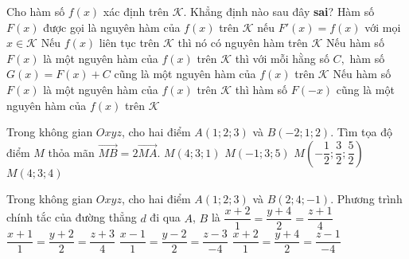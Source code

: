 \begin{ex}%
Cho hàm số $f(x)$ xác định trên $\mathscr{K}$. Khẳng định nào sau đây \textbf{sai}?
\choice
{Hàm số $F(x)$ được gọi là nguyên hàm của $f(x)$ trên $\mathscr{K}$ nếu $F'(x) = f(x)$ với mọi $x \in \mathscr{K}$}
{ Nếu $f(x)$ liên tục trên $\mathscr{K}$ thì nó có nguyên hàm trên $\mathscr{K}$}
{Nếu hàm số $F(x)$ là một nguyên hàm của $f(x)$ trên $\mathscr{K}$ thì với mỗi hằng số $C,$ hàm số $G(x) = F(x) + C$ cũng là một nguyên hàm của $f(x)$ trên $\mathscr{K}$}  
{\True Nếu hàm số $F(x)$ là một nguyên hàm của $f(x)$ trên $\mathscr{K}$ thì hàm số $F(-x)$ cũng là một nguyên hàm của $f(x)$ trên $\mathscr{K}$}  
\end{ex}

\begin{ex}%
Trong không gian $Oxyz$, cho hai điểm $A(1;2;3)$ và $B(-2;1;2)$. Tìm tọa độ điểm $M$ thỏa mãn $\overrightarrow{MB}=2\overrightarrow{MA}$.
\choice
	{$M(4;3;1)$}
	{$M(-1;3;5)$}
	{$M\left(-\dfrac{1}{2};\dfrac{3}{2};\dfrac{5}{2}\right)$}
	{\True $M(4;3;4)$}
\end{ex}

\begin{ex}%
Trong không gian $Oxyz$, cho hai điểm $A(1;2;3)$ và $B(2;4;-1)$. Phương trình chính tắc của đường thẳng $d$ đi qua $A$, $B$ là
	\choice
	{$\dfrac{x+2}{1}=\dfrac{y+4}{2}=\dfrac{z+1}{4}$}
	{$\dfrac{x+1}{1}=\dfrac{y+2}{2}=\dfrac{z+3}{4}$}
	{\True $\dfrac{x-1}{1}=\dfrac{y-2}{2}=\dfrac{z-3}{-4}$}
	{$\dfrac{x+2}{1}=\dfrac{y+4}{2}=\dfrac{z-1}{-4}$}
\end{ex}

